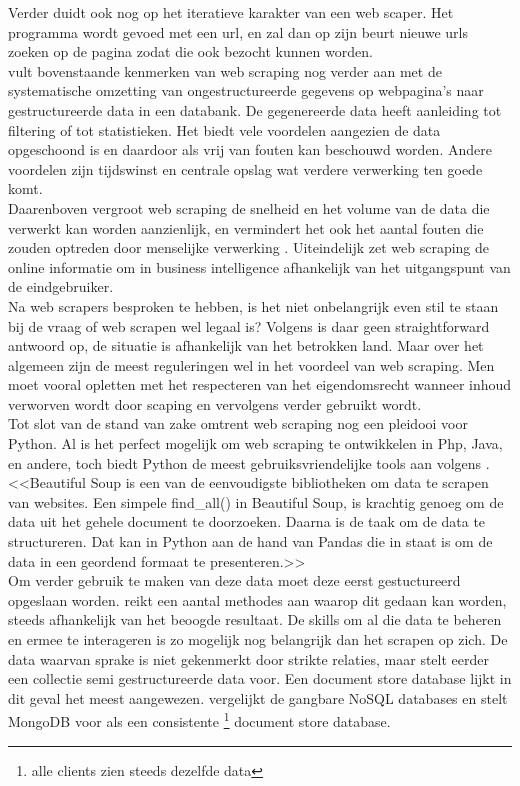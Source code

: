 Verder duidt \textcite{Lotfi2021} ook nog op het iteratieve karakter van een web scaper. Het programma wordt gevoed met een url, en zal dan op zijn beurt nieuwe urls zoeken op de pagina zodat die ook bezocht kunnen worden.\\
\textcite{Singrodia2019} vult bovenstaande kenmerken van web scraping nog verder aan met de systematische omzetting van ongestructureerde gegevens op webpagina's naar gestructureerde data in een databank. De gegenereerde data heeft aanleiding tot filtering of tot statistieken. Het biedt vele voordelen aangezien de data opgeschoond is en daardoor als vrij van fouten kan beschouwd worden. Andere voordelen zijn tijdswinst en centrale opslag wat verdere verwerking ten goede komt.\\
Daarenboven vergroot web scraping de snelheid en het volume van de data die verwerkt kan worden aanzienlijk, en vermindert het ook het aantal fouten die zouden optreden door menselijke verwerking \autocite{Bhatt2023}. Uiteindelijk zet web scraping de online informatie om in business intelligence afhankelijk van het uitgangspunt van de eindgebruiker.\\
Na web scrapers besproken te hebben, is het niet onbelangrijk even stil te staan bij de vraag of web scrapen wel legaal is? Volgens \textcite{EPSI2015} is daar geen straightforward antwoord op, de situatie is afhankelijk van het betrokken land. Maar over het algemeen zijn de meest reguleringen wel in het voordeel van web scraping. Men moet vooral opletten met het respecteren van het eigendomsrecht wanneer inhoud verworven wordt door scaping en vervolgens verder gebruikt wordt.\\
Tot slot van de stand van zake omtrent web scraping nog een pleidooi voor Python. Al is het perfect mogelijk om web scraping te ontwikkelen in Php, Java, en andere, toch biedt Python de meest gebruiksvriendelijke tools aan volgens \textcite{Kumar2023}. <<Beautiful Soup is een van de eenvoudigste bibliotheken om data te scrapen van websites. Een simpele find\_all() in Beautiful Soup, is krachtig genoeg om de data uit het gehele document te doorzoeken. Daarna is de taak om de data te structureren. Dat kan in Python aan de hand van Pandas die in staat is om de data in een geordend formaat te presenteren.>>\\
Om verder gebruik te maken van deze data moet deze eerst gestuctureerd opgeslaan worden. \textcite{Mitchell2015} reikt een aantal methodes aan waarop dit gedaan kan worden, steeds afhankelijk van het beoogde resultaat. De skills om al die data te beheren en ermee te interageren is zo mogelijk nog belangrijk dan het scrapen op zich. De data waarvan sprake is niet gekenmerkt door strikte relaties, maar stelt eerder een collectie semi gestructureerde data voor. Een document store database lijkt in dit geval het meest aangewezen. \textcite{Lourenco2015} vergelijkt de gangbare NoSQL databases en stelt MongoDB voor als een consistente \footnote{alle clients zien steeds dezelfde data} document store database.\\
